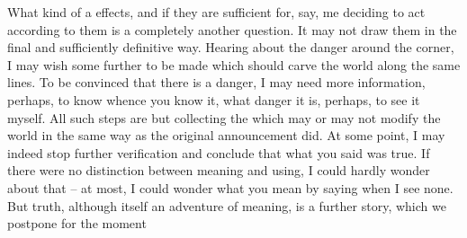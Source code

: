 What kind of  a  effects, and if they are sufficient
for, say, me deciding to act according to them is a completely another question.
It may not draw them in the final and sufficiently definitive way. Hearing about
the danger around the corner, I may wish some further  to be
made which should carve the world along the same lines.  To be convinced that
there is  a danger, I may need more information, perhaps, to know
whence you know it, what danger it is, perhaps, to  see it myself.
All such steps are but collecting the  which may or may not
modify the world in the same way as the original announcement did. At some
point, I may indeed stop further verification and conclude that what you said
was true.  If there were no distinction between meaning and using, I could
hardly wonder about that -- at most, I could wonder what you mean by saying
 when I see none.  But truth, although itself an adventure of
meaning, is a further story, which we postpone for the moment
